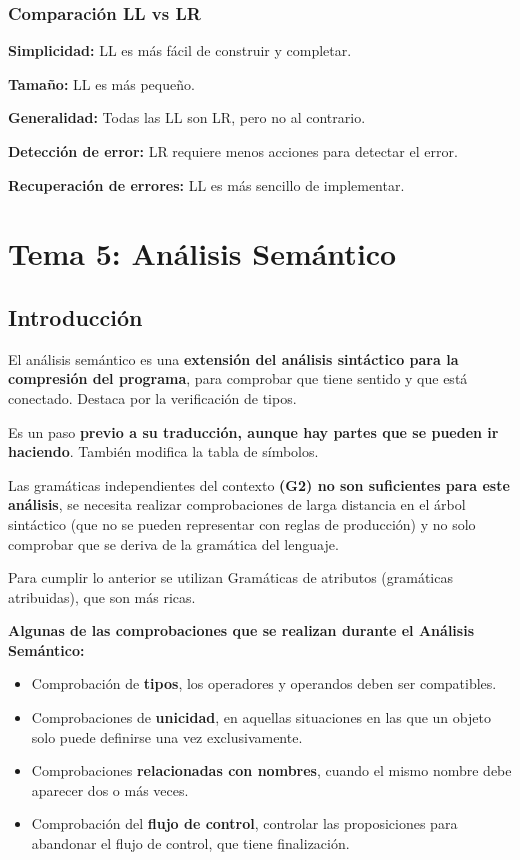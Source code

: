 \documentclass[12pt]{report} %
\begin{document}
\subsection{Comparación LL vs LR}
\textbf{Simplicidad:} LL es más fácil de construir y completar.

\textbf{Tamaño:} LL es más pequeño.

\textbf{Generalidad:} Todas las LL son LR, pero no al contrario.

\textbf{Detección de error:} LR requiere menos acciones para detectar el error.

\textbf{Recuperación de errores:} LL es más sencillo de implementar.

\chapter{Tema 5: Análisis Semántico}

\section{Introducción}
El análisis semántico es una \textbf{extensión del análisis sintáctico para la compresión del programa}, para comprobar que tiene sentido y que está conectado. Destaca por la verificación de tipos.

Es un paso \textbf{previo a su traducción, aunque hay partes que se pueden ir haciendo}. También modifica la tabla de símbolos.

Las gramáticas independientes del contexto \textbf{(G2) no son suficientes para este análisis}, se necesita realizar comprobaciones de larga distancia en el árbol sintáctico (que no se pueden representar con reglas de producción) y no solo comprobar que se deriva de la gramática del lenguaje.

Para cumplir lo anterior se utilizan Gramáticas de atributos (gramáticas atribuidas), que son más ricas.

\textbf{Algunas de las comprobaciones que se realizan durante el Análisis Semántico:}
\begin{itemize}
  \item Comprobación de \textbf{tipos}, los operadores y operandos deben ser compatibles.
  \item Comprobaciones de \textbf{unicidad}, en aquellas situaciones en las que un objeto solo puede definirse una vez exclusivamente.
  \item Comprobaciones \textbf{relacionadas con nombres}, cuando el mismo nombre debe aparecer dos o más veces.
  \item Comprobación del \textbf{flujo de control}, controlar las proposiciones para abandonar el flujo de control, que tiene finalización.
\end{itemize}
\pagebreak
\end{document}

